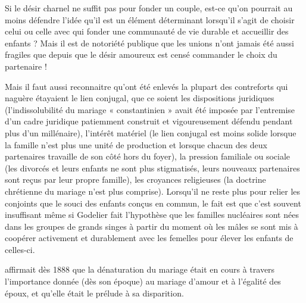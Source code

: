  Si le désir charnel ne suffit pas pour fonder un couple, est-ce qu'on pourrait au moins défendre l'idée qu'il est un élément déterminant lorsqu'il s'agit de choisir celui ou celle avec qui fonder une communauté de vie durable et accueillir des enfants ? Mais il est de notoriété publique que les unions n'ont jamais été aussi fragiles que depuis que le désir amoureux est censé commander le choix du partenaire ! 
 
 Mais il faut aussi reconnaitre qu'ont été enlevés la plupart des contreforts qui naguère étayaient le lien conjugal, que ce soient les dispositions juridiques (l'indissolubilité du mariage « constantinien » avait été imposée par l'entremise d'un cadre juridique patiemment construit et vigoureusement défendu pendant plus d'un millénaire), l'intérêt matériel (le lien conjugal est moins solide lorsque la famille n'est plus une unité de production et lorsque chacun des deux partenaires travaille de son côté hors du foyer), la pression familiale ou sociale (les divorcés et leurs enfants ne sont plus stigmatisés, leurs nouveaux partenaires sont reçus par leur propre famille), les croyances religieuses (la doctrine chrétienne du mariage n'est plus comprise). Lorsqu'il ne reste plus pour relier les conjoints que le souci des enfants conçus en commun, le fait est que c'est souvent insuffisant même si Godelier fait l'hypothèse que les familles nucléaires sont nées dans les groupes de grands singes à partir du moment où les mâles se sont mis à coopérer activement et durablement avec les femelles pour élever les enfants de celles-ci. 
 
   affirmait dès 1888 que la dénaturation du mariage était en cours à travers l'importance donnée (dès son époque) au mariage d'amour et à l'égalité des époux, et qu'elle était le prélude à sa disparition.

